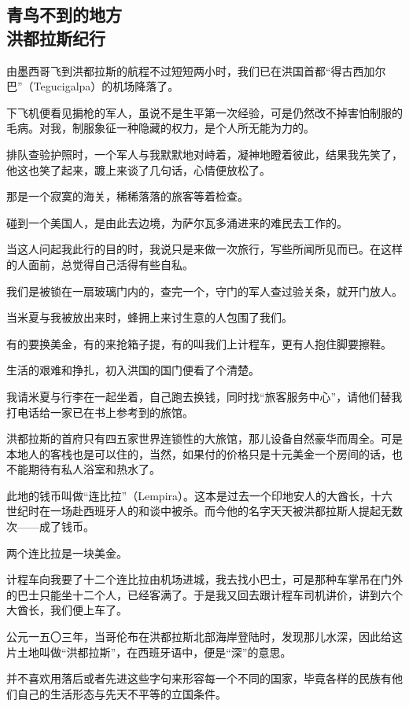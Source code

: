 \subsection{青鸟不到的地方\\\small{洪都拉斯纪行}}
\par 由墨西哥飞到洪都拉斯的航程不过短短两小时，我们已在洪国首都“得古西加尔巴”（Tegucigalpa）的机场降落了。
\par 下飞机便看见掮枪的军人，虽说不是生平第一次经验，可是仍然改不掉害怕制服的毛病。对我，制服象征一种隐藏的权力，是个人所无能为力的。
\par 排队查验护照时，一个军人与我默默地对峙着，凝神地瞪着彼此，结果我先笑了，他这也笑了起来，踱上来谈了几句话，心情便放松了。
\par 那是一个寂寞的海关，稀稀落落的旅客等着检查。
\par 碰到一个美国人，是由此去边境，为萨尔瓦多涌进来的难民去工作的。
\par 当这人问起我此行的目的时，我说只是来做一次旅行，写些所闻所见而已。在这样的人面前，总觉得自己活得有些自私。
\par 我们是被锁在一扇玻璃门内的，查完一个，守门的军人查过验关条，就开门放人。
\par 当米夏与我被放出来时，蜂拥上来讨生意的人包围了我们。
\par 有的要换美金，有的来抢箱子提，有的叫我们上计程车，更有人抱住脚要擦鞋。
\par 生活的艰难和挣扎，初入洪国的国门便看了个清楚。
\par 我请米夏与行李在一起坐着，自己跑去换钱，同时找“旅客服务中心”，请他们替我打电话给一家已在书上参考到的旅馆。
\par 洪都拉斯的首府只有四五家世界连锁性的大旅馆，那儿设备自然豪华而周全。可是本地人的客栈也是可以住的，当然，如果付的价格只是十元美金一个房间的话，也不能期待有私人浴室和热水了。
\par 此地的钱币叫做“连比拉”（Lempira）。这本是过去一个印地安人的大酋长，十六世纪时在一场赴西班牙人的和谈中被杀。而今他的名字天天被洪都拉斯人提起无数次——成了钱币。
\par 两个连比拉是一块美金。
\par 计程车向我要了十二个连比拉由机场进城，我去找小巴士，可是那种车掌吊在门外的巴士只能坐十二个人，已经客满了。于是我又回去跟计程车司机讲价，讲到六个大酋长，我们便上车了。
\par 公元一五〇三年，当哥伦布在洪都拉斯北部海岸登陆时，发现那儿水深，因此给这片土地叫做“洪都拉斯”，在西班牙语中，便是“深”的意思。
\par 并不喜欢用落后或者先进这些字句来形容每一个不同的国家，毕竟各样的民族有他们自己的生活形态与先天不平等的立国条件。
